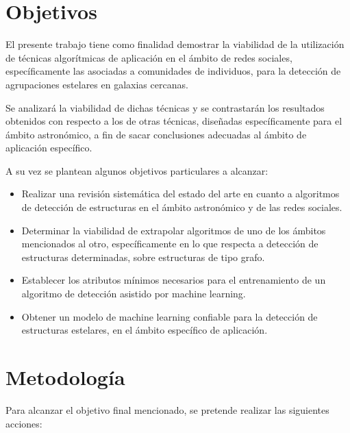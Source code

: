 \documentclass[
	11pt,oneside,a4paper,
	headsepline,footsepline,plainfootsepline,plainheadsepline,
	fleqn,
]{article}
\begin{document}
\section{Objetivos}

El presente trabajo tiene como finalidad demostrar la viabilidad de la utilización de técnicas algorítmicas de aplicación en el ámbito de redes sociales, específicamente las asociadas a comunidades de individuos, para la detección de agrupaciones estelares en galaxias cercanas.

Se analizará la viabilidad de dichas técnicas y se contrastarán los resultados obtenidos con respecto a los de otras técnicas, diseñadas específicamente para el ámbito astronómico, a fin de sacar conclusiones adecuadas al ámbito de aplicación específico.

A su vez se plantean algunos objetivos particulares a alcanzar:

\begin{itemize}
	\item Realizar una revisión sistemática del estado del arte en cuanto a algoritmos de detección de estructuras en el ámbito astronómico y de las redes sociales.
	\item Determinar la viabilidad de extrapolar algoritmos de uno de los ámbitos mencionados al otro, específicamente en lo que respecta a detección de estructuras determinadas, sobre estructuras de tipo grafo.
	\item Establecer los atributos mínimos necesarios para el entrenamiento de un algoritmo de detección asistido por machine learning.
	\item Obtener un modelo de machine learning confiable para la detección de estructuras estelares, en el ámbito específico de aplicación.
\end{itemize}

\section{Metodología}

Para alcanzar el objetivo final mencionado, se pretende realizar las siguientes acciones:
\end{document}
